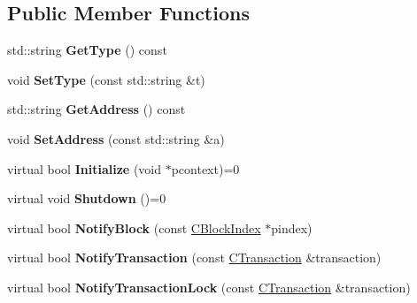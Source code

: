 \subsection*{Public Member Functions}
\begin{DoxyCompactItemize}
\item 
\mbox{\label{class_c_z_m_q_abstract_notifier_a046ca6a48d0174e64ac8011382df4275}} 
std\+::string {\bfseries Get\+Type} () const
\item 
\mbox{\label{class_c_z_m_q_abstract_notifier_ab4179b7aeac89ce1a9214a46b21a4899}} 
void {\bfseries Set\+Type} (const std\+::string \&t)
\item 
\mbox{\label{class_c_z_m_q_abstract_notifier_a9ff17afd5effbe071af0a31a6bd31eb7}} 
std\+::string {\bfseries Get\+Address} () const
\item 
\mbox{\label{class_c_z_m_q_abstract_notifier_a6ada06e94b36fb8c872ad880ae2eb3d6}} 
void {\bfseries Set\+Address} (const std\+::string \&a)
\item 
\mbox{\label{class_c_z_m_q_abstract_notifier_a877029827c0b1224bf0826a2e433e370}} 
virtual bool {\bfseries Initialize} (void $\ast$pcontext)=0
\item 
\mbox{\label{class_c_z_m_q_abstract_notifier_a08713a9b91625eb86b400523fef3b2c6}} 
virtual void {\bfseries Shutdown} ()=0
\item 
\mbox{\label{class_c_z_m_q_abstract_notifier_a85c604b1fb2559c98b04a4c885b96192}} 
virtual bool {\bfseries Notify\+Block} (const \mbox{\hyperlink{class_c_block_index}{C\+Block\+Index}} $\ast$pindex)
\item 
\mbox{\label{class_c_z_m_q_abstract_notifier_a91809065c7bf730a5f2144e2424b7d8f}} 
virtual bool {\bfseries Notify\+Transaction} (const \mbox{\hyperlink{class_c_transaction}{C\+Transaction}} \&transaction)
\item 
\mbox{\label{class_c_z_m_q_abstract_notifier_a249ef399ed514c38b941cdb516fecb55}} 
virtual bool {\bfseries Notify\+Transaction\+Lock} (const \mbox{\hyperlink{class_c_transaction}{C\+Transaction}} \&transaction)
\end{DoxyCompactItemize}
